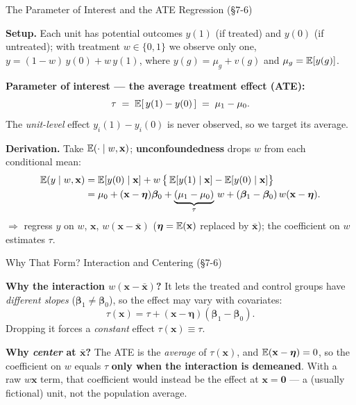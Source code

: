 \documentclass[aspectratio=169, 12pt]{beamer}
\begin{document}
\begin{frame}[shrink=10]{The Parameter of Interest and the ATE Regression (\S7-6)}

  \begin{keybox}
    \textbf{Setup.} Each unit has potential outcomes $y(1)$ (if treated) and $y(0)$ (if
    untreated); with treatment $w\in\{0,1\}$ we observe only one,
    $y = (1-w)\,y(0) + w\,y(1)$, where $y(g)=\mu_g+v(g)$ and $\mu_g=\operatorname{\mathbb{E}}[y(g)]$.

    \smallskip
    \textbf{Parameter of interest --- the average treatment effect (ATE):}
    \[
      \tau \;=\; \operatorname{\mathbb{E}}[\,y(1)-y(0)\,] \;=\; \mu_1-\mu_0 .
    \]
    The \emph{unit-level} effect $y_i(1)-y_i(0)$ is never observed, so we target its average.
  \end{keybox}

  \textbf{Derivation.} Take $\operatorname{\mathbb{E}}(\cdot\mid w,\mathbf{x})$; \textbf{unconfoundedness} drops $w$
  from each conditional mean:
  \begin{align*}
    \operatorname{\mathbb{E}}(y \mid w, \mathbf{x})
      &= \operatorname{\mathbb{E}}[y(0)\mid\mathbf{x}] + w\,\big\{\operatorname{\mathbb{E}}[y(1)\mid\mathbf{x}] - \operatorname{\mathbb{E}}[y(0)\mid\mathbf{x}]\big\} \\
      &= \mu_0 + (\mathbf{x}-\boldsymbol\eta)\boldsymbol\beta_0
         + \underbrace{(\mu_1-\mu_0)}_{\tau}\,w
         + (\boldsymbol\beta_1-\boldsymbol\beta_0)\,w(\mathbf{x}-\boldsymbol\eta).
  \end{align*}
  $\Rightarrow$ regress $y$ on $w$, $\mathbf{x}$, $w(\mathbf{x}-\bar{\mathbf{x}})$
  ($\boldsymbol\eta=\operatorname{\mathbb{E}}(\mathbf{x})$ replaced by $\bar{\mathbf{x}}$); the coefficient on $w$
  estimates $\tau$.

\end{frame}

\begin{frame}{Why That Form? Interaction and Centering (\S7-6)}

  \begin{keybox}
    \textbf{Why the interaction $w(\mathbf{x}-\bar{\mathbf{x}})$?} It lets the treated and
    control groups have \emph{different slopes} ($\boldsymbol\beta_1\neq\boldsymbol\beta_0$),
    so the effect may vary with covariates:
    \[
      \tau(\mathbf{x}) = \tau + (\mathbf{x}-\boldsymbol\eta)(\boldsymbol\beta_1-\boldsymbol\beta_0).
    \]
    Dropping it forces a \emph{constant} effect $\tau(\mathbf{x})\equiv\tau$.
  \end{keybox}

  \begin{highlightbox}
    \textbf{Why \emph{center} at $\bar{\mathbf{x}}$?} The ATE is the \emph{average} of
    $\tau(\mathbf{x})$, and $\operatorname{\mathbb{E}}(\mathbf{x}-\boldsymbol\eta)=0$, so the coefficient on $w$
    equals $\tau$ \textbf{only when the interaction is demeaned}. With a raw $w\mathbf{x}$
    term, that coefficient would instead be the effect at $\mathbf{x}=\mathbf{0}$ --- a
    (usually fictional) unit, not the population average.
  \end{highlightbox}

\end{frame}
\end{document}
